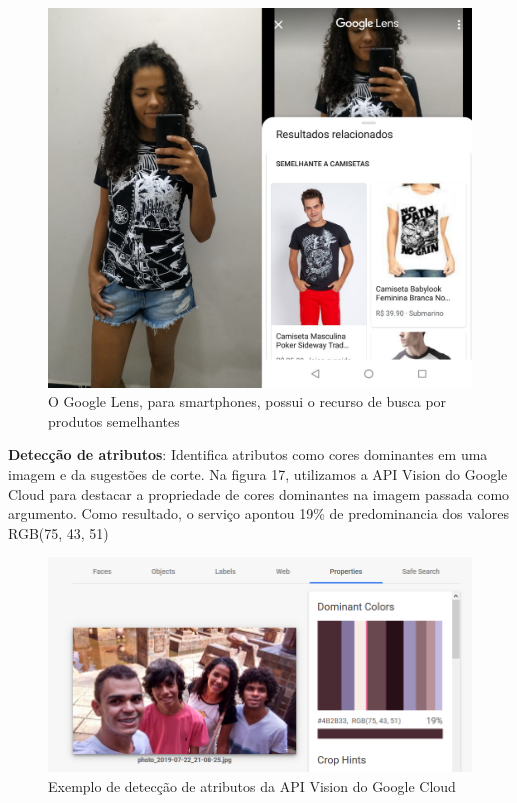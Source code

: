 \documentclass{article}
\begin{document}
\begin{figure}[H]
    \centering
    \includegraphics[scale=0.3]{imagens/produtos_semelhantes.png}
    \caption{O Google Lens, para smartphones, possui o recurso de busca por produtos semelhantes}
    \label{fig:produtos_semelhantes}
\end{figure}{}
\textbf{Detecção de atributos}: Identifica atributos como cores dominantes em uma imagem e da sugestões de corte. Na figura 17, utilizamos a API Vision do Google Cloud para destacar a propriedade de cores dominantes na imagem passada como argumento. Como resultado, o serviço apontou 19\% de predominancia dos valores RGB(75, 43, 51)\\
\begin{figure}[H]
    \centering
    \includegraphics[scale=0.3]{imagens/propriedades.png}
    \caption{Exemplo de detecção de atributos da API Vision do Google Cloud}
    \label{fig:atributos}
\end{figure}{}
\end{document}
